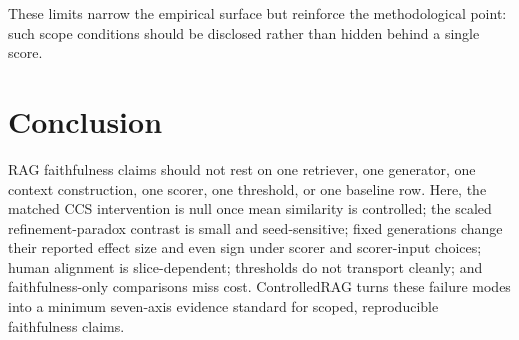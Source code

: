 \noindent These limits narrow the empirical surface but reinforce the
methodological point: such scope conditions should be disclosed rather
than hidden behind a single score.

\section{Conclusion}
\label{sec:conclusion}

RAG faithfulness claims should not rest on one retriever, one generator,
one context construction, one scorer, one threshold, or one baseline row.
Here, the matched CCS intervention is null once mean similarity is
controlled; the scaled refinement-paradox contrast is small and
seed-sensitive; fixed generations change their reported effect size and
even sign under scorer and scorer-input choices; human alignment is
slice-dependent; thresholds do not transport cleanly; and
faithfulness-only comparisons miss cost. ControlledRAG turns these
failure modes into a minimum seven-axis evidence standard for scoped,
reproducible faithfulness claims.

